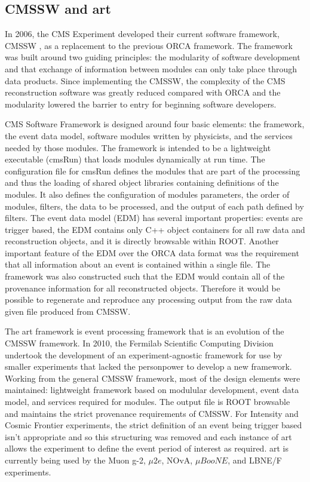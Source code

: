 \subsection{CMSSW and art}

In 2006, the CMS Experiment developed their current software framework, CMSSW \cite{cmssw}, as a replacement to the previous ORCA framework. The framework was built around two guiding principles: the modularity of software development and that exchange of information between modules can only take place through data products. Since implementing the CMSSW, the complexity of the CMS reconstruction software was greatly reduced compared with ORCA and the modularity lowered the barrier to entry for beginning software developers.

CMS Software Framework is designed around four basic elements: the framework, the event data model, software modules written by physicists, and the services needed by those modules\cite{cmssw_web}. The framework is intended to be a lightweight executable (cmsRun) that loads modules dynamically at run time. The configuration file for cmsRun defines the modules that are part of the processing and thus the loading of shared object libraries containing definitions of the modules. It also defines the configuration of modules parameters, the order of modules, filters, the data to be processed, and the output of each path defined by filters. The event data model (EDM) has several important properties: events are trigger based, the EDM contains only C++ object containers for all raw data and reconstruction objects, and it is directly browsable within ROOT. Another important feature of the EDM over the ORCA data format was the requirement that all information about an event is contained within a single file. The framework was also constructed such that the EDM would contain all of the provenance information for all reconstructed objects. Therefore it would be possible to regenerate and reproduce any processing output from the raw data given file produced from CMSSW.

The art framework is event processing framework that is an evolution of the CMSSW framework. In 2010, the Fermilab Scientific Computing Division undertook the development of an experiment-agnostic framework for use by smaller experiments that lacked the personpower to develop a new framework. Working from the general CMSSW framework, most of the design elements were maintained: lightweight framework based on modulular development, event data model, and services required for modules. The output file is ROOT browsable and maintains the strict provenance requirements of CMSSW. For Intensity and Cosmic Frontier experiments, the strict definition of an event being trigger based isn't appropriate and so this structuring was removed and each instance of art allows the experiment to define the event period of interest as required. art is currently being used by the Muon g-2, $\mu2e$, NOvA, $\mu BooNE$, and LBNE/F experiments.

